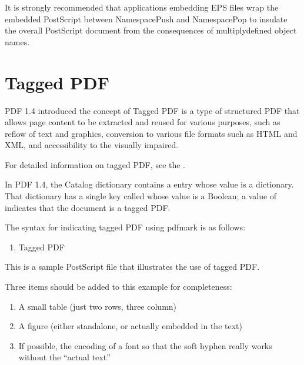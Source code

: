 \documentclass[letterpaper,12pt,english,openany,oneside]{sphinxmanual}
\begin{document}
It is strongly recommended that applications embedding EPS files wrap the embedded PostScript between NamespacePush and NamespacePop to insulate the overall PostScript document from the consequences of multiply\sphinxhyphen{}defined object names.


\section{Tagged PDF}
\label{\detokenize{pdfmark_Logical:tagged-pdf}}
PDF 1.4 introduced the concept of  Tagged PDF is a type of structured PDF that allows page content to be extracted and reused for various purposes, such as reflow of text and graphics, conversion to various file formats such as HTML and XML, and accessibility to the visually impaired.

For detailed information on tagged PDF, see the  .

In PDF 1.4, the Catalog dictionary contains a  entry whose value is a dictionary. That dictionary has a single key called  whose value is a Boolean; a value of  indicates that the document is a tagged PDF.

The syntax for indicating tagged PDF using pdfmark is as follows:

\begin{sphinxVerbatim}[commandchars=\\\{\}]
\PYG{p}{[}          
\end{sphinxVerbatim}
\begin{enumerate}
%
\item {} 
Tagged PDF

\end{enumerate}

This is a sample PostScript file that illustrates the use of tagged PDF.

Three items should be added to this example for completeness:
\begin{enumerate}
%
\item {} 
A small table (just two rows, three column)

\item {} 
A figure (either standalone, or actually embedded in the text)

\item {} 
If possible, the encoding of a font so that the soft hyphen really works without the “actual text”

\end{enumerate}
\end{document}
